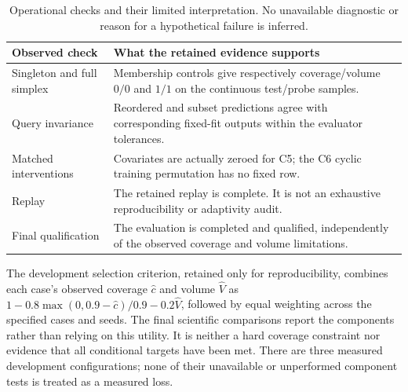 \documentclass{article}
\begin{document}
{\begin{table}[ht]
\centering\small
\begin{tabular}{p{}p{}}
\toprule
Observed check & What the retained evidence supports \\
\midrule
Singleton and full simplex & Membership controls give respectively coverage/volume $0/0$ and $1/1$ on the continuous test/probe samples. \\
Query invariance & Reordered and subset predictions agree with corresponding fixed-fit outputs within the evaluator tolerances. \\
Matched interventions & Covariates are actually zeroed for C5; the C6 cyclic training permutation has no fixed row. \\
Replay & The retained replay is complete. It is not an exhaustive reproducibility or adaptivity audit. \\
Final qualification & The evaluation is completed and qualified, independently of the observed coverage and volume limitations. \\
\bottomrule
\end{tabular}
\caption{Operational checks and their limited interpretation. No unavailable diagnostic or reason for a hypothetical failure is inferred.}
\end{table}

The development selection criterion, retained only for reproducibility, combines each case's observed coverage $\widehat c$ and volume $\widehat V$ as $1-0.8\max(0,0.9-\widehat c)/0.9-0.2\widehat V$, followed by equal weighting across the specified cases and seeds. The final scientific comparisons report the components rather than relying on this utility. It is neither a hard coverage constraint nor evidence that all conditional targets have been met. There are three measured development configurations; none of their unavailable or unperformed component tests is treated as a measured loss.

}
\end{document}
